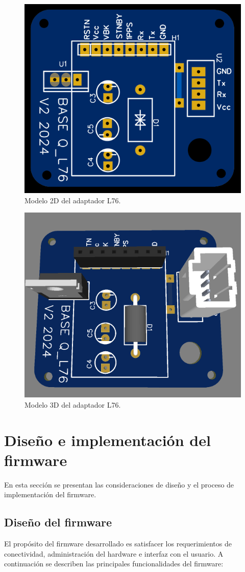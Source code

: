 \begin{figure}[htbp]
	\centering
	\includegraphics[width=.4\textwidth]{./Figures/QL76_modelo_2d_sup.png}
	\caption{Modelo 2D del adaptador L76.}
	\label{fig:adap_L76_2d}
\end{figure}

\begin{figure}[htbp]
	\centering
	\includegraphics[width=.4\textwidth]{./Figures/QL76_modelo_3d_sup.png}
	\caption{Modelo 3D del adaptador L76.}
	\label{fig:adap_L76_3d}
\end{figure}



\section{Diseño e implementación del firmware}

En esta sección se presentan las consideraciones de diseño y el proceso de implementación del firmware. 

\subsection{Diseño del firmware}

El propósito del firmware desarrollado es satisfacer los requerimientos de conectividad, administración del hardware e interfaz con el usuario. A continuación se describen las principales funcionalidades del firmware: 

